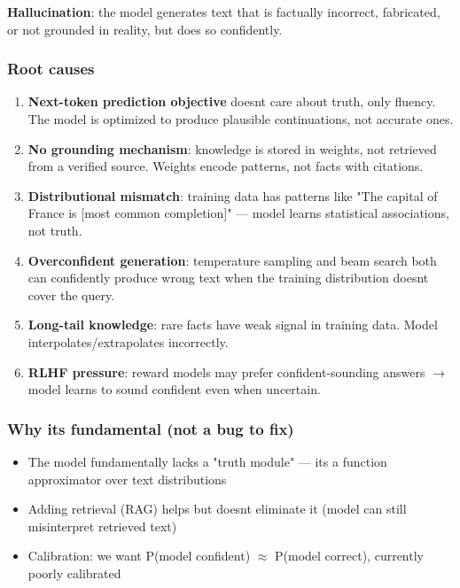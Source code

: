\documentclass[11pt]{article}
\providecommand{\tightlist}{\setlength{\itemsep}{1pt}\setlength{\parskip}{0pt}}
\begin{document}
\textbf{Hallucination}: the model generates text that is factually incorrect, fabricated, or not grounded in reality, but does so confidently.

\subsubsection{Root causes}\label{root-causes}

\begin{enumerate}
\def\labelenumi{\arabic{enumi}.}
\item
  \textbf{Next-token prediction objective} doesn\textquotesingle t care about truth, only fluency. The model is optimized to produce plausible continuations, not accurate ones.
\item
  \textbf{No grounding mechanism}: knowledge is stored in weights, not retrieved from a verified source. Weights encode patterns, not facts with citations.
\item
  \textbf{Distributional mismatch}: training data has patterns like "The capital of France is {[}most common completion{]}" --- model learns statistical associations, not truth.
\item
  \textbf{Overconfident generation}: temperature sampling and beam search both can confidently produce wrong text when the training distribution doesn\textquotesingle t cover the query.
\item
  \textbf{Long-tail knowledge}: rare facts have weak signal in training data. Model interpolates/extrapolates incorrectly.
\item
  \textbf{RLHF pressure}: reward models may prefer confident-sounding answers \(\rightarrow\) model learns to sound confident even when uncertain.
\end{enumerate}

\subsubsection{Why it\textquotesingle s fundamental (not a bug to fix)}\label{why-its-fundamental-not-a-bug-to-fix}

\begin{itemize}
\tightlist
\item
  The model fundamentally lacks a "truth module" --- it\textquotesingle s a function approximator over text distributions
\item
  Adding retrieval (RAG) helps but doesn\textquotesingle t eliminate it (model can still misinterpret retrieved text)
\item
  Calibration: we want P(model confident) \(\approx\) P(model correct), currently poorly calibrated
\end{itemize}
\end{document}
